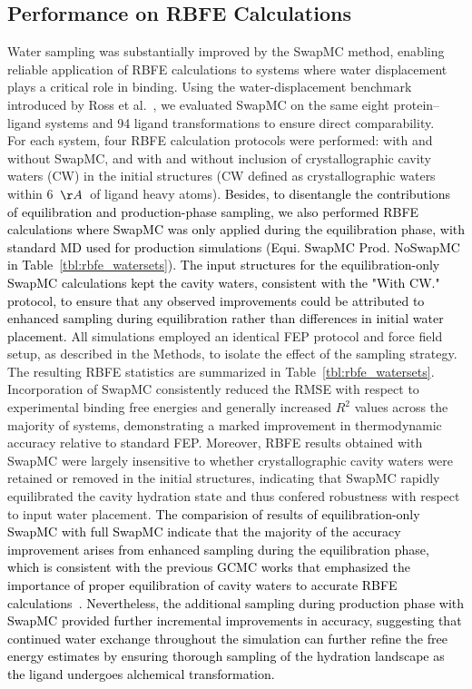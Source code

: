 \documentclass[journal=jacsat,manuscript=article]{achemso}
\newcommand*{\textblue}[1]{\textcolor{black}{#1}}
\begin{document}
\subsection{Performance on RBFE Calculations}
\noindent
Water sampling was substantially improved by the SwapMC method, 
enabling reliable application of RBFE calculations to systems where water displacement plays a critical role in binding. 
Using the water-displacement benchmark introduced by Ross et al.~\cite{ross2020enhancing}, 
we evaluated SwapMC on the same eight protein–ligand systems and 94 ligand transformations to ensure direct comparability. \\
\newline
For each system, four RBFE calculation protocols were performed: with and without SwapMC, and with and without inclusion of crystallographic cavity waters (CW) in the initial structures (CW defined as crystallographic waters within 6~$\AA$~of ligand heavy atoms).
\textblue{
Besides, to disentangle the contributions of equilibration and production-phase sampling,
we also performed RBFE calculations where SwapMC was only applied during the equilibration phase,
with standard MD used for production simulations (Equi. SwapMC Prod. NoSwapMC in Table~\ref{tbl:rbfe_watersets}).
The input structures for the equilibration-only SwapMC calculations kept the cavity waters, consistent with the "With CW." protocol, 
to ensure that any observed improvements could be attributed to enhanced sampling during equilibration rather than differences in initial water placement.
}
All simulations employed an identical FEP protocol and force field setup, as described in the Methods, to isolate the effect of the sampling strategy. \\
\newline
The resulting RBFE statistics are summarized in Table~\ref{tbl:rbfe_watersets}. 
Incorporation of SwapMC consistently reduced the RMSE with respect to experimental binding free energies and generally increased $R^2$ values across the majority of systems, 
demonstrating a marked improvement in thermodynamic accuracy relative to standard FEP. 
Moreover, RBFE results obtained with SwapMC were largely insensitive to whether crystallographic cavity waters were retained or removed in the initial structures, 
indicating that SwapMC rapidly equilibrated the cavity hydration state and thus confered robustness with respect to input water placement. 
\textblue{
The comparision of results of equilibration-only SwapMC with full SwapMC indicate that the majority of the accuracy improvement arises from enhanced sampling during the equilibration phase,
which is consistent with the previous GCMC works that emphasized the importance of proper equilibration of cavity waters to accurate RBFE calculations~\cite{ross2020enhancing, ben2021fast}.
Nevertheless, the additional sampling during production phase with SwapMC provided further incremental improvements in accuracy, 
suggesting that continued water exchange throughout the simulation can further refine the free energy estimates by ensuring thorough sampling of the hydration landscape as the ligand undergoes alchemical transformation.
}
\end{document}
